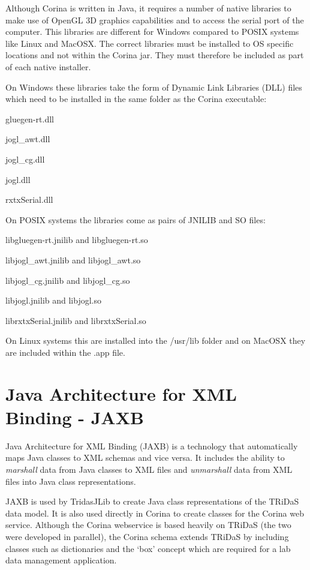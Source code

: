 Although Corina is written in Java, it requires a number of native libraries to make use of OpenGL 3D graphics capabilities and to access the serial port of the computer.  This libraries are different for Windows compared to POSIX systems like Linux and MacOSX.  The correct libraries must be installed to OS specific locations and not within the Corina jar.  They must therefore be included as part of each native installer.

On Windows these libraries take the form of Dynamic Link Libraries (DLL) files which need to be installed in the same folder as the Corina executable:

\begin{itemize*}
 \item gluegen-rt.dll
 \item jogl\_awt.dll
 \item jogl\_cg.dll
 \item jogl.dll
 \item rxtxSerial.dll
\end{itemize*}

On POSIX systems the libraries come as pairs of JNILIB and SO files:

\begin{itemize*}
 \item libgluegen-rt.jnilib and libgluegen-rt.so
 \item libjogl\_awt.jnilib and libjogl\_awt.so
 \item libjogl\_cg.jnilib and libjogl\_cg.so
 \item libjogl.jnilib and libjogl.so
 \item librxtxSerial.jnilib and librxtxSerial.so
\end{itemize*}

On Linux systems this are installed into the /usr/lib folder and on MacOSX they are included within the .app file.

\section{Java Architecture for XML Binding - JAXB}
\label{txt:jaxb}

Java Architecture for XML Binding (JAXB) is a technology that automatically maps Java classes to XML schemas and vice versa.  It includes the ability to \emph{marshall} data from Java classes to XML files and \emph{unmarshall} data from XML files into Java class representations.  

JAXB is used by TridasJLib to create Java class representations of the TRiDaS data model.  It is also used directly in Corina to create classes for the Corina web service.  Although the Corina webservice is based heavily on TRiDaS (the two were developed in parallel), the Corina schema extends TRiDaS by including classes such as dictionaries and the `box' concept which are required for a lab data management application.  

